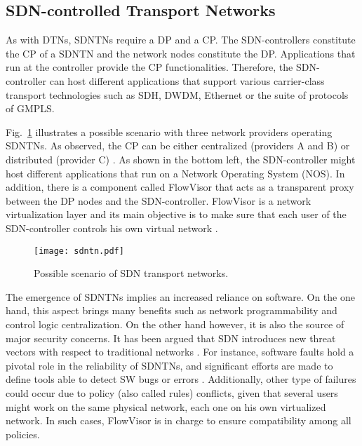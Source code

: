 \documentclass[10pt,draftclsnofoot,onecolumn,journal]{IEEEtran}
\begin{document}
\subsection{SDN-controlled Transport Networks}



As with DTNs, SDNTNs require a DP and a CP. The SDN-controllers constitute the CP of a SDNTN and the network nodes constitute the DP. Applications that run at the controller provide the CP functionalities. Therefore, the SDN-controller can host different applications that support various carrier-class transport technologies such as SDH, DWDM, Ethernet or the suite of protocols of GMPLS.

Fig.~\ref{fig:sdntn} illustrates a possible scenario with three network providers operating SDNTNs. As observed, the CP can be either centralized (providers A and B) or distributed (provider C) \cite{Gringeri2013SDNTN,distributed2013sdtns}. As shown in the bottom left, the SDN-controller might host different applications that run on a Network Operating System (NOS). In addition, there is a component called FlowVisor that acts as a transparent proxy between the DP nodes and the SDN-controller. FlowVisor is a network virtualization layer and its main objective is to make sure that each user of the SDN-controller controls his own virtual network \cite{sherwood2009flowvisor}.

\begin{figure}
\centering
\texttt{[image: sdntn.pdf]}
\caption{Possible scenario of SDN transport networks.}
\label{fig:sdntn}
\end{figure}

The emergence of SDNTNs implies an increased reliance on software. On the one hand, this aspect brings many benefits such as network programmability and control logic centralization. On the other hand however, it is also the source of major security concerns. It has been argued that SDN introduces new threat vectors with respect to traditional networks \cite{vectorsvulnerable2013SDN}. For instance, software faults hold a pivotal role in the reliability of SDNTNs, and significant efforts are made to define tools able to detect SW bugs or errors \cite{Canini2012NICE}. Additionally, other type of failures could occur due to policy (also called rules) conflicts, given that several users might work on the same physical network, each one on his own virtualized network. In such cases, FlowVisor is in charge to ensure compatibility among all policies.
\end{document}
